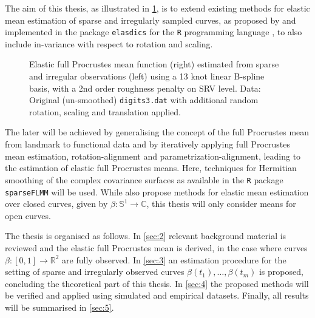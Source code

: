 The aim of this thesis, as illustrated in \cref{fig:1-mean}, is to extend existing methods for elastic mean estimation of sparse and irregularly sampled curves, as proposed by \cite{Steyer2021} and implemented in the package \texttt{elasdics} \parencite{elasdics} for the \texttt{R} programming language \parencite{R}, to also include in-variance with respect to rotation and scaling.
\begin{figure}
  \centering
  \begin{subfigure}{.48\textwidth}
    \centering
  \end{subfigure}\hfill%
  \begin{subfigure}{.48\textwidth}
    \centering
  \end{subfigure}
  \caption{Elastic full Procrustes mean function (right) estimated from sparse and irregular observations (left) using a 13 knot linear B-spline basis, with a 2nd order roughness penalty on SRV level. Data: Original (un-smoothed) \texttt{digits3.dat} with additional random rotation, scaling and translation applied.}
  \label{fig:1-mean}
\end{figure}
The later will be achieved by generalising the concept of the full Procrustes mean from landmark to functional data and by iteratively applying full Procrustes mean estimation, rotation-alignment and parametrization-alignment, leading to the estimation of elastic full Procrustes means.
Here, techniques for Hermitian smoothing of the complex covariance surfaces as available in the \texttt{R} package \texttt{sparseFLMM} \parencite{sparseFLMM} will be used.
While \citeauthor{Steyer2021} also propose methods for elastic mean estimation over closed curves, given by $\beta:\mathbb{S}^1 \rightarrow \mathbb{C}$, this thesis will only consider means for open curves. 

The thesis is organised as follows.
In \cref{sec:2} relevant background material is reviewed and the elastic full Procrustes mean is derived, in the case where curves $\beta:[0,1] \rightarrow \mathbb{R}^2$ are fully observed. 
In \cref{sec:3} an estimation procedure for the setting of sparse and irregularly observed curves $\beta(t_1), \dots, \beta(t_m)$ is proposed, concluding the theoretical part of this thesis.
In \cref{sec:4} the proposed methods will be verified and applied using simulated and empirical datasets.
Finally, all results will be summarised in \cref{sec:5}.
